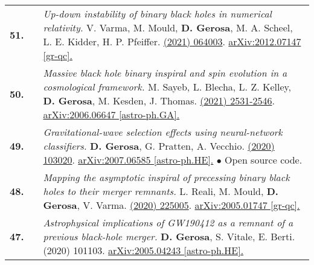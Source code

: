 {\begin{longtable}{rp{0.3cm}p{15.8cm}}
%
\textbf{51.} & & \textit{Up-down instability of binary black holes in numerical relativity.}
\newline{}
V. Varma, M. Mould, \textbf{D. Gerosa}, M. A. Scheel, L. E. Kidder, H. P. Pfeiffer.
\newline{}
\href{https://journals.aps.org/prd/abstract/10.1103/PhysRevD.103.064003}{\prd 103 (2021) 064003}. \href{https://arxiv.org/abs/2012.07147}{arXiv:2012.07147 [gr-qc].}
\vspace{0.09cm}\\
%
\textbf{50.} & & \textit{Massive black hole binary inspiral and spin evolution in a cosmological framework.}
\newline{}
M. Sayeb, L. Blecha, L. Z. Kelley, \textbf{D. Gerosa}, M. Kesden, J. Thomas.
\newline{}
\href{https://doi.org/10.1093/mnras/staa3826}{\mnras 501 (2021) 2531-2546}. \href{https://arxiv.org/abs/2006.06647}{arXiv:2006.06647 [astro-ph.GA].}
\vspace{0.09cm}\\
%
\textbf{49.} & & \textit{Gravitational-wave selection effects using neural-network classifiers.}
\newline{}
\textbf{D. Gerosa}, G. Pratten, A. Vecchio.
\newline{}
\href{https://journals.aps.org/prd/abstract/10.1103/PhysRevD.102.103020}{\prd 102 (2020) 103020}. \href{https://arxiv.org/abs/2007.06585}{arXiv:2007.06585 [astro-ph.HE].}
\newline{}
\textcolor{color1}{$\bullet$} Open source code.
\vspace{0.09cm}\\
%
\textbf{48.} & & \textit{Mapping the asymptotic inspiral of precessing binary black holes to their merger remnants.}
\newline{}
L. Reali, M. Mould, \textbf{D. Gerosa}, V. Varma.
\newline{}
\href{https://iopscience.iop.org/article/10.1088/1361-6382/abb639/meta}{\cqg 37 (2020) 225005}. \href{https://arxiv.org/abs/2005.01747}{arXiv:2005.01747 [gr-qc].}
\vspace{0.09cm}\\
%
\textbf{47.} & & \textit{Astrophysical implications of GW190412 as a remnant of a previous black-hole merger.}
\newline{}
\textbf{D. Gerosa}, S. Vitale, E. Berti.
\newline{}
{\prl 125 (2020) 101103}. \href{https://arxiv.org/abs/2005.04243}{arXiv:2005.04243 [astro-ph.HE].}
\newline{}

\end{longtable}}
